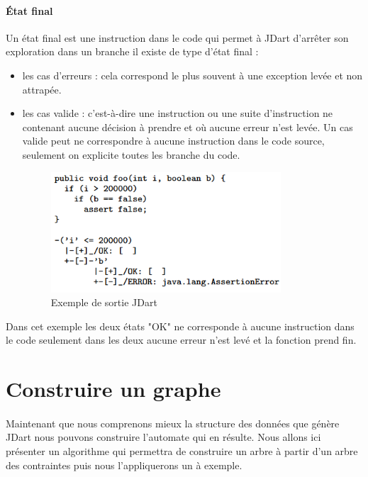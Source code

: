 \paragraph{État final}
Un état final est une instruction dans le code qui permet à JDart d'arrêter son 
exploration dans un branche il existe de type d'état final : 
\begin{itemize}
 \item les cas d'erreurs : cela correspond le plus souvent à une exception 
levée et non attrapée.
 \item les cas valide : c'est-à-dire une instruction ou une suite 
d'instruction ne contenant aucune décision à prendre et où aucune erreur n'est 
levée. Un cas valide peut ne correspondre à aucune instruction dans le code 
source, seulement on explicite toutes les branche du code.

\begin{figure}[H]
	\centering	
	\includegraphics[scale=0.5]{images/jdart_exemple.png}
	\caption{\label{fig:jdart_sample} Exemple de sortie JDart}
	\label{fig:exemple_out_jdart}
\end{figure}
\end{itemize}

Dans cet exemple les deux états "OK" ne corresponde à aucune instruction dans 
le code seulement dans les deux aucune erreur n'est levé et la fonction prend 
fin.


\section{Construire un graphe}

\paragraph{}
Maintenant que nous comprenons mieux la structure des données que génère JDart 
nous pouvons construire l'automate qui en résulte. Nous allons ici présenter un 
algorithme qui permettra de construire un arbre à partir d'un arbre des 
contraintes puis nous l'appliquerons un à exemple.

